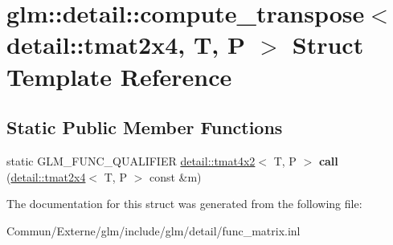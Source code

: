 \hypertarget{structglm_1_1detail_1_1compute__transpose_3_01detail_1_1tmat2x4_00_01_t_00_01_p_01_4}{}\section{glm\+:\+:detail\+:\+:compute\+\_\+transpose$<$ detail\+:\+:tmat2x4, T, P $>$ Struct Template Reference}
\label{structglm_1_1detail_1_1compute__transpose_3_01detail_1_1tmat2x4_00_01_t_00_01_p_01_4}
\subsection*{Static Public Member Functions}
\begin{DoxyCompactItemize}
\item 
static G\+L\+M\+\_\+\+F\+U\+N\+C\+\_\+\+Q\+U\+A\+L\+I\+F\+I\+ER \hyperlink{structglm_1_1detail_1_1tmat4x2}{detail\+::tmat4x2}$<$ T, P $>$ {\bfseries call} (\hyperlink{structglm_1_1detail_1_1tmat2x4}{detail\+::tmat2x4}$<$ T, P $>$ const \&m)\hypertarget{structglm_1_1detail_1_1compute__transpose_3_01detail_1_1tmat2x4_00_01_t_00_01_p_01_4_a773fe20856af1171dcc8d60246eea5d2}{}\label{structglm_1_1detail_1_1compute__transpose_3_01detail_1_1tmat2x4_00_01_t_00_01_p_01_4_a773fe20856af1171dcc8d60246eea5d2}

\end{DoxyCompactItemize}


The documentation for this struct was generated from the following file\+:\begin{DoxyCompactItemize}
\item 
Commun/\+Externe/glm/include/glm/detail/func\+\_\+matrix.\+inl\end{DoxyCompactItemize}
